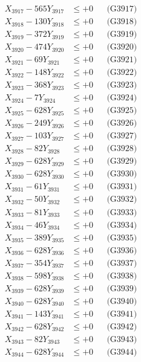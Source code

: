 \documentclass[a4paper,10pt]{article}
\begin{document}
{\begin{align}
X_{3917} - 565Y_{3917} &\leq +0 && \text{(G3917)} \\
X_{3918} - 130Y_{3918} &\leq +0 && \text{(G3918)} \\
X_{3919} - 372Y_{3919} &\leq +0 && \text{(G3919)} \\
X_{3920} - 474Y_{3920} &\leq +0 && \text{(G3920)} \\
\allowbreak
X_{3921} - 69Y_{3921} &\leq +0 && \text{(G3921)} \\
X_{3922} - 148Y_{3922} &\leq +0 && \text{(G3922)} \\
X_{3923} - 368Y_{3923} &\leq +0 && \text{(G3923)} \\
X_{3924} - 7Y_{3924} &\leq +0 && \text{(G3924)} \\
X_{3925} - 628Y_{3925} &\leq +0 && \text{(G3925)} \\
X_{3926} - 249Y_{3926} &\leq +0 && \text{(G3926)} \\
X_{3927} - 103Y_{3927} &\leq +0 && \text{(G3927)} \\
X_{3928} - 82Y_{3928} &\leq +0 && \text{(G3928)} \\
X_{3929} - 628Y_{3929} &\leq +0 && \text{(G3929)} \\
X_{3930} - 628Y_{3930} &\leq +0 && \text{(G3930)} \\
\allowbreak
X_{3931} - 61Y_{3931} &\leq +0 && \text{(G3931)} \\
X_{3932} - 50Y_{3932} &\leq +0 && \text{(G3932)} \\
X_{3933} - 81Y_{3933} &\leq +0 && \text{(G3933)} \\
X_{3934} - 46Y_{3934} &\leq +0 && \text{(G3934)} \\
X_{3935} - 389Y_{3935} &\leq +0 && \text{(G3935)} \\
X_{3936} - 628Y_{3936} &\leq +0 && \text{(G3936)} \\
X_{3937} - 354Y_{3937} &\leq +0 && \text{(G3937)} \\
X_{3938} - 598Y_{3938} &\leq +0 && \text{(G3938)} \\
X_{3939} - 628Y_{3939} &\leq +0 && \text{(G3939)} \\
X_{3940} - 628Y_{3940} &\leq +0 && \text{(G3940)} \\
\allowbreak
X_{3941} - 143Y_{3941} &\leq +0 && \text{(G3941)} \\
X_{3942} - 628Y_{3942} &\leq +0 && \text{(G3942)} \\
X_{3943} - 82Y_{3943} &\leq +0 && \text{(G3943)} \\
X_{3944} - 628Y_{3944} &\leq +0 && \text{(G3944)} \\

\end{align}}
\end{document}

